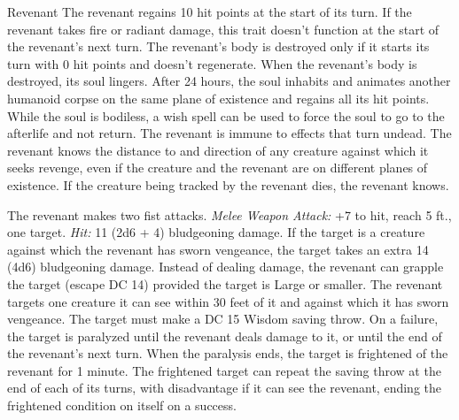 \documentclass[10pt,a4paper,twoside,twocolumn,openany,bg=none,nodeprecatedcode]{dndbook}
\begin{document}
\begin{DndMonster}[float*=t]{Revenant}
\DndMonsterBasics[
armor-class = {13 (leather armor)},
hit-points = {\DndDice{16d8 + 64}},
speed = {30 ft.}
]
\DndMonsterAbilityScores[
 str = 18,
 dex = 14,
 con = 18,
 int = 13,
 wis = 16,
 cha = 18
]
\DndMonsterDetails[
saving-throws = {Str +7, Con +7, Wis +6, Cha +7},
damage-resistances = {necrotic, psychic},
damage-immunities = {poison},
senses = {darkvision 60 ft., passive perception 13},
languages = {the languages it knew in life},
challenge = 5,
]
The revenant regains 10 hit points at the start of its turn. If the revenant takes fire or radiant damage, this trait doesn't function at the start of the revenant's next turn. The revenant's body is destroyed only if it starts its turn with 0 hit points and doesn't regenerate.
When the revenant's body is destroyed, its soul lingers. After 24 hours, the soul inhabits and animates another humanoid corpse on the same plane of existence and regains all its hit points. While the soul is bodiless, a wish spell can be used to force the soul to go to the afterlife and not return.
The revenant is immune to effects that turn undead.
The revenant knows the distance to and direction of any creature against which it seeks revenge, even if the creature and the revenant are on different planes of existence. If the creature being tracked by the revenant dies, the revenant knows.
\par
{}
The revenant makes two fist attacks.
\textsl{Melee Weapon Attack:} +7 to hit, reach 5 ft., one target. \textsl{Hit:} 11 (2d6 + 4) bludgeoning damage. If the target is a creature against which the revenant has sworn vengeance, the target takes an extra 14 (4d6) bludgeoning damage. Instead of dealing damage, the revenant can grapple the target (escape DC 14) provided the target is Large or smaller.
The revenant targets one creature it can see within 30 feet of it and against which it has sworn vengeance. The target must make a DC 15 Wisdom saving throw. On a failure, the target is paralyzed until the revenant deals damage to it, or until the end of the revenant's next turn. When the paralysis ends, the target is frightened of the revenant for 1 minute. The frightened target can repeat the saving throw at the end of each of its turns, with disadvantage if it can see the revenant, ending the frightened condition on itself on a success.
\end{DndMonster}
\end{document}
